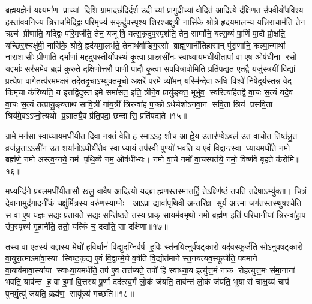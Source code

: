 ब्र॒ह्म॒य॒ज्ञेन॑ य॒क्ष्यमा॑ण॒ प्राच्यां दि॒शि ग्रामा॒दछ॑दिर्द॒र्\mbox{}श उदीच्यां प्रागुदी॒च्यां वो॒दित॑ आदि॒त्ये द॑क्षिण॒त उ॑प॒वीयो॑प॒विश्य॒ हस्ता॑वव॒निज्य॒ त्रिराचा॑मे॒द्द्विः प॑रि॒मृज्य॑ स॒कृदु॑प॒स्पृश्य॒ शिर॒श्चक्षु॑षी॒ नासि॑के॒ श्रोत्रे॒ हृद॑यमा॒लभ्य॒ यत्त्रिरा॒चाम॑ति॒ तेन॒ ऋच॑ प्रीणाति॒ यद्द्विः प॑रि॒मृज॑ति॒ तेन॒ यजूषि॒ यत्स॒कृदु॑प॒स्पृश॑ति॒ तेन॒ सामा॑नि॒ यत्स॒व्यं पा॒णिं पा॒दौ प्रो॒क्षति॒ यच्छिर॒श्चक्षु॑षी॒ नासि॑के॒ श्रोत्रे॒ हृद॑यमा॒लभ॑ते॒ तेनाथ॑र्वाङ्गि॒रसो ब्राह्म॒णानी॑तिहा॒सान् पु॑रा॒णानि॒ कल्पा॒न्गाथा॑ नाराश॒सीः प्री॑णाति॒ दर्भा॑णां म॒हदु॑प॒स्तीर्यो॒पस्थं॑ कृ॒त्वा प्राङासी॑नः स्वाध्या॒यमधी॑यीता॒पां वा ए॒ष ओष॑धीना॒ रसो॒ यद्द॒र्भाः सर॑समे॒व ब्रह्म॑ कुरुते दक्षिणोत्त॒रौ पा॒णी पा॒दौ कृ॒त्वा सप॒वित्रा॒वोमिति॒ प्रति॑पद्यत ए॒तद्वै यजु॑स्त्रयीं वि॒द्यां प्रत्ये॒षा वागे॒तत्प॑र॒मम॒क्षरं॒ तदे॒तदृ॒चाऽभ्यु॑क्तमृ॒चो अ॒क्षरे॑ पर॒मे व्यो॑म॒न् यस्मि॑न्दे॒वा अधि॒ विश्वे॑ निषे॒दुर्यस्तन्न वेद॒ किमृ॒चा क॑रिष्यति॒ य इत्तद्वि॒दुस्त इ॒मे समा॑सत॒ इति॒ त्रीने॒व प्रायु॑ङ्क्त॒ भूर्भुव॒ स्व॑रित्या॑है॒तद्वै वा॒चः स॒त्यं यदे॒व वा॒चः स॒त्यं तत्प्रायु॒ङ्क्ताथ॑ सावि॒त्रीं गा॑य॒त्रीं त्रिरन्वा॑ह प॒च्छोऽर्धर्च॑शोऽनवा॒न स॑वि॒ता श्रिय॑ प्रसवि॒ता श्रिय॑मे॒वऽऽप्नो॒त्यथो प्र॒ज्ञात॑यै॒व प्र॑ति॒पदा॒ छन्दासि॒ प्रति॑पद्यते॥१५॥\anuvakamend


ग्रामे॒ मन॑सा स्वाध्या॒यमधी॑यीत॒ दिवा॒ नक्तं॑ वे॒ति ह॑ स्मा॒ऽऽह शौ॒च आह्ने॒य उ॒तार॑ण्ये॒ऽबल॑ उ॒त वा॒चोत तिष्ठ॑न्नु॒त व्रज॑न्नु॒ताऽऽसी॑न उ॒त शया॑नो॒ऽधीयी॑तै॒व स्वाध्या॒यं तप॑स्वी॒ पुण्यो॑ भवति॒ य ए॒वं विद्वान्त्स्वाध्या॒यमधी॑ते॒ नमो॒ ब्रह्म॑णे॒ नमो॑ अस्त्व॒ग्नये॒ नम॑ पृथि॒व्यै नम॒ ओष॑धीभ्यः। नमो॑ वा॒चे नमो॑ वा॒चस्पत॑ये॒ नमो॒ विष्ण॑वे बृह॒ते क॑रोमि॥१६॥
\anuvakamend


म॒ध्यन्दि॑ने प्र॒बल॒मधी॑यीता॒सौ खलु॒ वावैष आ॑दि॒त्यो यद्ब्राह्म॒ण\-स्तस्मा॒त्तर्\mbox{}हि॒ तेऽक्ष्णि॑ष्ठं तपति॒ तदे॒षाऽभ्यु॑क्ता। चि॒त्रं दे॒वाना॒मुद॑गा॒\-दनी॑कं॒ चक्षु॑र्मि॒त्रस्य॒ वरु॑णस्या॒ग्नेः। आऽप्रा॒ द्यावा॑पृथि॒वी अ॒न्तरि॑क्ष॒ सूर्य॑ आ॒त्मा जग॑तस्त॒स्थुष॒श्चेति॒ स वा ए॒ष य॒ज्ञः स॒द्यः प्रता॑यते स॒द्यः सन्ति॑ष्ठते॒ तस्य॒ प्राक् सा॒यम॑वभृ॒थो नमो॒ ब्रह्म॑ण॒ इति॑ परिधा॒नीयां॒ त्रिरन्वा॑हा॒प उ॑प॒स्पृश्य॑ गृ॒हाने॑ति॒ ततो॒ यत्किं च॒ ददा॑ति॒ सा दक्षि॑णा॥१७॥\anuvakamend


तस्य॒ वा ए॒तस्य॑ य॒ज्ञस्य॒ मेघो॑ हवि॒र्धानं॑ वि॒द्युद॒ग्निर्\mbox{}व॒र्\mbox{}ष ह॒विः स्त॑नयि॒त्नुर्व॑षट्का॒रो यद॑व॒स्फूर्ज॑ति॒ सोऽनु॑वषट्का॒रो वा॒युरा॒त्माऽमा॑वा॒स्या स्विष्ट॒कृद्य ए॒वं वि॒द्वान्मे॒घे व॒र्\mbox{}षति॑ वि॒द्योत॑माने स्त॒नय॑त्यव॒स्फूर्ज॑ति॒ पव॑माने वा॒याव॑मावा॒स्या॑या स्वाध्या॒यमधी॑ते॒ तप॑ ए॒व तत्त॑प्यते॒ तपो॑ हि स्वाध्या॒य इत्यु॑त्त॒मं नाक रोहत्युत्त॒मः स॑मा॒नानां भवति॒ याव॑न्त ह॒ वा इ॒मां वि॒त्तस्य॑ पू॒र्णां दद॑त्स्व॒र्गं लो॒कं ज॑यति॒ ताव॑न्तं लो॒कं ज॑यति॒ भूयासं चाक्ष॒य्यं चाप॑ पुनर्मृ॒त्युं ज॑यति॒ ब्रह्म॑ण॒ सायु॑ज्यं गच्छति॥१८॥\anuvakamend


